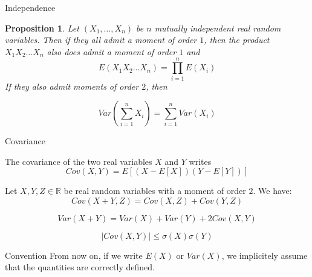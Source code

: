 \documentclass[usenames,dvipsnames]{beamer}
\newtheorem*{proposition}{Proposition}
\begin{document}
\begin{frame}{Independence}
\begin{proposition}
    Let $(X_1, \dots, X_n)$ be $n$ mutually independent real random variables. Then if they all admit a moment of order $1$, then the product $X_1X_2\dots X_n$ also does admit a moment of order $1$ and 
    \begin{equation*}
	E(X_1X_2\dots X_n) = \prod^{n}_{i=1} E(X_i)
    \end{equation*}
    If they also admit moments of order $2$, then
    
    \begin{equation*}
	Var( \sum^{n}_{i=1} X_i ) = \sum^{n}_{i=1} Var(X_i)
    \end{equation*}
\end{proposition}
\end{frame}

\begin{frame}{Covariance}

    The covariance of the two real variables $X$ and $Y$ writes
    \begin{equation}
	Cov(X, Y) = E[(X-E[X])(Y-E[Y])]
    \end{equation}
\begin{lemma}
    Let $X, Y, Z\in \mathbb{R} $ be real random variables with a moment of order $2$. We have:
\begin{equation*}
    Cov(X+Y, Z) = Cov(X,Z)+Cov(Y,Z)
\end{equation*}

\begin{equation*}
    Var(X+Y) = Var(X)+Var(Y)+2Cov(X,Y)
\end{equation*}

\begin{equation*}
    |Cov(X,Y)|\leq \sigma(X)\sigma(Y)
\end{equation*}
\end{lemma}
    
\end{frame}

\begin{frame}{Convention}
    From now on, if we write $E(X)$ or $Var(X)$, we implicitely assume that the quantities are correctly defined. 
\end{frame}
\end{document}
